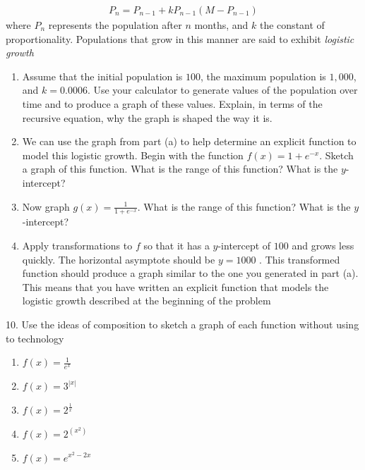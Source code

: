 \documentclass[10pt,]{book}
\theoremstyle{plain}
\theoremstyle{definition}
\theoremstyle{definition}
\theoremstyle{definition}
\numberwithin{equation}{section}
\begin{document}
\begin{exerciselist}
%
\begin{gather*}
P_n = P_{n-1} + kP_{n-1} \left( M - P_{n-1} \right)
\end{gather*}
\hypertarget{p-268}{}%
where \(P_n\) represents the population after \(n\) months, and \(k\) the constant of proportionality.  Populations that grow in this manner are said to exhibit \emph{logistic growth}%
\leavevmode%
\begin{enumerate}[label=(\alph*)]
\item\hypertarget{li-155}{}Assume that the initial population is \(100\), the maximum population is \(1,000\), and \(k = 0.0006\).  Use your calculator to generate values of the population over time and to produce a graph of these values.  Explain, in terms of the recursive equation, why the graph is shaped the way it is.%
\item\hypertarget{li-156}{}We can use the graph from part (a) to help determine an explicit function to model this logistic growth.  Begin with the function \(f(x) = 1 + e^{-x}\).  Sketch a graph of this function.  What is the range of this function?  What is the \(y\)-intercept?%
\item\hypertarget{li-157}{}Now graph \(g(x) = \frac{1}{1+e^{-x}}\).  What is the range of this function?  What is the \(y\)-intercept?%
\item\hypertarget{li-158}{}Apply transformations to \(f\) so that it has a \(y\)-intercept of \(100\) and grows less quickly.  The horizontal asymptote should be \(y = 1000\) .  This transformed function should produce a graph similar to the one you generated in part (a). This means that you have written an explicit function that models the logistic growth described at the beginning of the problem%
\end{enumerate}
\par\smallskip
\item[10.]\hypertarget{exercise-71}{}\hypertarget{p-269}{}%
Use the ideas of composition to sketch a graph of each function without using to technology%
\leavevmode%
\begin{enumerate}[label=(\alph*)]
\item\hypertarget{li-159}{}\(f(x)=\frac{1}{e^x}\)%
\item\hypertarget{li-160}{}\(f(x)=3^{|x|}\)%
\item\hypertarget{li-161}{}\(f(x)=2^{\frac{1}{x}}\)%
\item\hypertarget{li-162}{}\(f(x)=2^{\left(x^2\right)}\)%
\item\hypertarget{li-163}{}\(f(x)=e^{x^2-2x}\)%

\end{enumerate}
\end{exerciselist}
\end{document}
